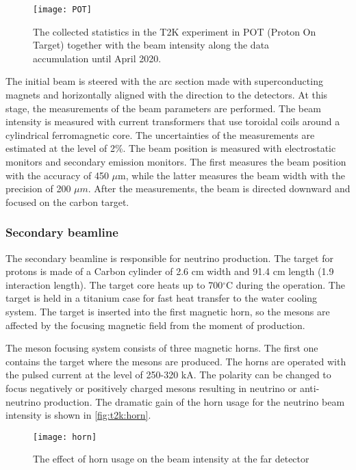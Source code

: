 \documentclass[../main.tex]{subfiles}
\begin{document}
\begin{figure}[!ht]
  \centering
  \texttt{[image: POT]}
  \caption{The collected statistics in the T2K experiment in POT (Proton On Target) together with the beam intensity along the data accumulation until April 2020.}
  \label{fig:t2k:POT}
\end{figure}

The initial beam is steered with the arc section made with superconducting magnets and horizontally aligned with the direction to the detectors. At this stage, the measurements of the beam parameters are performed. The beam intensity is measured with current transformers that use toroidal coils around a cylindrical ferromagnetic core. The uncertainties of the measurements are estimated at the level of 2\%. The beam position is measured with electrostatic monitors and secondary emission monitors. The first measures the beam position with the accuracy of 450 $\mu \text{m}$, while the latter measures the beam width with the precision of 200 $\mu m$. After the measurements, the beam is directed downward and focused on the carbon target.

\subsubsection{Secondary beamline}
The secondary beamline is responsible for neutrino production. The target for protons is made of a Carbon cylinder of 2.6 cm width and 91.4 cm length (1.9 interaction length). The target core heats up to 700$^\circ$C during the operation. The target is held in a titanium case for fast heat transfer to the water cooling system. The target is inserted into the first magnetic horn, so the mesons are affected by the focusing magnetic field from the moment of production.

The meson focusing system consists of three magnetic horns. The first one contains the target where the mesons are produced. The horns are operated with the pulsed current at the level of 250-320 kA. The polarity can be changed to focus negatively or positively charged mesons resulting in neutrino or anti-neutrino production. The dramatic gain of the horn usage for the neutrino beam intensity is shown in \autoref{fig:t2k:horn}.

\begin{figure}[!ht]
  \centering
    \texttt{[image: horn]}
    \caption{The effect of horn usage on the beam intensity at the far detector}
    \label{fig:t2k:horn}
\end{figure}
\end{document}

